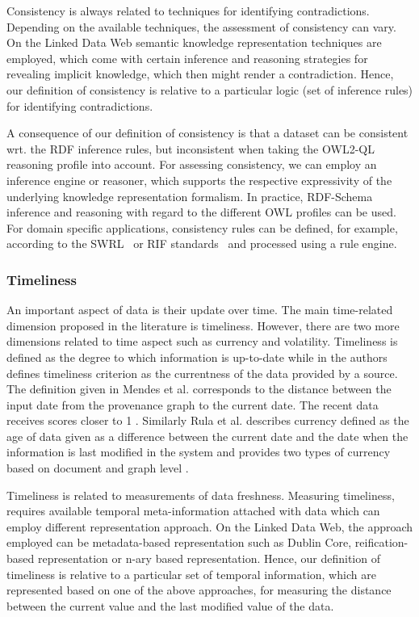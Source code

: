 \begin{definition}[Consistency]
Consistency is always related to techniques for identifying contradictions.
Depending on the available techniques, the assessment of consistency can vary.
On the Linked Data Web semantic knowledge representation techniques are employed, which come with certain inference and reasoning strategies for revealing implicit knowledge, which then might render a contradiction.
Hence, our definition of consistency is relative to a particular logic (set of inference rules) for identifying contradictions.
\end{definition}

A consequence of our definition of consistency is that a dataset can be consistent wrt. the RDF inference rules, but inconsistent when taking the OWL2-QL reasoning profile into account.
For assessing consistency, we can employ an inference engine or reasoner, which supports the respective expressivity of the underlying knowledge representation formalism.
In practice, RDF-Schema inference and reasoning with regard to the different OWL profiles can be used.
For domain specific applications, consistency rules can be defined, for example, according to the SWRL~\cite{Horrocks} or RIF standards~\cite{Kifer} and processed using a rule engine.

\subsubsection{Timeliness}
An important aspect of data is their update over time. The main time-related dimension proposed in the literature is timeliness. However, there are two more dimensions related to time aspect such as currency and volatility.
Timeliness is defined as the degree to which information is up-to-date \cite{Bizerthesis} while in \cite{Flemming} the authors defines timeliness criterion as the currentness of the data provided by a source. The definition given in Mendes et al. corresponds to the distance between the input date from the provenance graph to the current date. The recent data receives scores closer to 1 \cite{Mendes}. Similarly Rula et al. describes currency defined as the age of data given as a difference between the current date and the date when the information is last modified in the system and provides two types of currency based on document and graph level \cite{Rula2012}.
\begin{definition}[Timeliness]
Timeliness is related to measurements of data freshness. Measuring timeliness, requires available temporal meta-information attached with data which can employ different representation approach. On the Linked Data Web, the approach employed can be metadata-based representation such as Dublin Core,  reification-based representation or n-ary based representation. Hence, our definition of timeliness is relative to a particular set of temporal information, which are represented based on one of the above approaches, for measuring the distance between the current value and the last modified value of the data. 
\end{definition}

